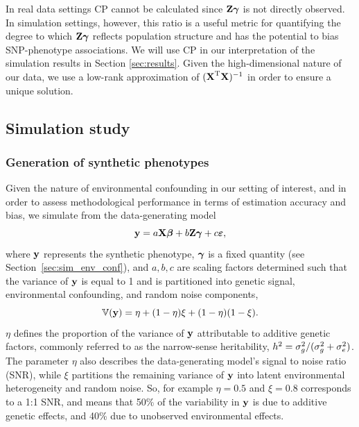 In real data settings CP cannot be calculated since $\textbf{Z} \boldsymbol{\gamma}$ is not directly observed. In simulation settings, however, this ratio is a useful metric for quantifying the degree to which $\textbf{Z} \boldsymbol{\gamma}$ reflects population structure and has the potential to bias SNP-phenotype associations. We will use CP in our interpretation of the simulation results in Section \ref{sec:results}. Given the high-dimensional nature of our data, we use a low-rank approximation of $(\textbf{X}^{\text{T}} \textbf{X})^{-1}$ in order to ensure a unique solution.

\subsection{Simulation study}

\subsubsection{Generation of synthetic phenotypes}

Given the nature of environmental confounding in our setting of interest, and in order to assess methodological performance in terms of estimation accuracy and bias, we simulate from the data-generating model
\begin{equation}
    \label{eqn:sim}
    \textbf{y} = a \textbf{X} \boldsymbol{\beta}{} + b \textbf{Z} \boldsymbol{\gamma} + c \boldsymbol{\varepsilon}{},
\end{equation}
where $\textbf{y}$ represents the synthetic phenotype, $\boldsymbol{\gamma}$ is a fixed quantity (see Section~\ref{sec:sim_env_conf}), and $a, b, c$ are scaling factors determined such that the variance of $\textbf{y}$ is equal to 1 and is partitioned into genetic signal, environmental confounding, and random noise components,
\begin{equation}
    \label{eqn:parition_y}
    \mathbb{V}(\textbf{y}) = \eta + (1 - \eta) \xi + (1-\eta)(1-\xi).
\end{equation}
$\eta$ defines the proportion of the variance of $\textbf{y}$ attributable to additive genetic factors, commonly referred to as the narrow-sense heritability, $h^2 = \sigma^2_g/(\sigma^2_g + \sigma^2_e)$. The parameter $\eta$ also describes the data-generating model's signal to noise ratio (SNR), while $\xi$ partitions the remaining variance of $\textbf{y}$ into latent environmental heterogeneity and random noise. So, for example $\eta = 0.5$ and $\xi = 0.8$ corresponds to a 1:1 SNR, and means that 50\% of the variability in $\textbf{y}$ is due to additive genetic effects, and 40\% due to unobserved environmental effects. 


